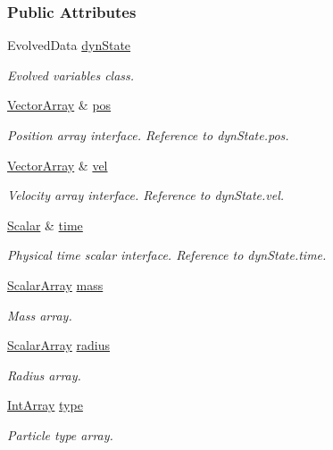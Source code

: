 \subsubsection*{Public Attributes}
\begin{DoxyCompactItemize}
\item 
Evolved\+Data \mbox{\hyperlink{classparticle_system_a68651a7d05d0799f3eda4e785fcec725}{dyn\+State}}
\begin{DoxyCompactList}\small\item\em Evolved variables class. \end{DoxyCompactList}\item 
\mbox{\hyperlink{classparticle_system_a6f66ed187a286c0d42ab2f83b8b6193b}{Vector\+Array}} \& \mbox{\hyperlink{classparticle_system_ae845daf120c9ad16dea4f2ca1df5b11a}{pos}}
\begin{DoxyCompactList}\small\item\em Position array interface. Reference to dyn\+State.\+pos. \end{DoxyCompactList}\item 
\mbox{\hyperlink{classparticle_system_a6f66ed187a286c0d42ab2f83b8b6193b}{Vector\+Array}} \& \mbox{\hyperlink{classparticle_system_a545da170c4d59f18c6ddb18817cb5f3e}{vel}}
\begin{DoxyCompactList}\small\item\em Velocity array interface. Reference to dyn\+State.\+vel. \end{DoxyCompactList}\item 
\mbox{\hyperlink{classparticle_system_a28e49da72c0ca5786d0611e6128a8994}{Scalar}} \& \mbox{\hyperlink{classparticle_system_a2edb9719905f209d84079450c1a01280}{time}}
\begin{DoxyCompactList}\small\item\em Physical time scalar interface. Reference to dyn\+State.\+time. \end{DoxyCompactList}\item 
\mbox{\hyperlink{classparticle_system_af7f328120ff85c8b34edeed4a68b746e}{Scalar\+Array}} \mbox{\hyperlink{classparticle_system_ada52f9d5fc33ca23a9ab6dee96d88957}{mass}}
\begin{DoxyCompactList}\small\item\em Mass array. \end{DoxyCompactList}\item 
\mbox{\hyperlink{classparticle_system_af7f328120ff85c8b34edeed4a68b746e}{Scalar\+Array}} \mbox{\hyperlink{classparticle_system_a8f1ca1c5c748549b9b1fc57cb9bd01a0}{radius}}
\begin{DoxyCompactList}\small\item\em Radius array. \end{DoxyCompactList}\item 
\mbox{\hyperlink{classparticle_system_aee9dc82f46ce17a477251805094cf19f}{Int\+Array}} \mbox{\hyperlink{classparticle_system_afafaf8f74705b4f569be8d7e4d78aa4f}{type}}
\begin{DoxyCompactList}\small\item\em Particle type array. \end{DoxyCompactList}\end{DoxyCompactItemize}
